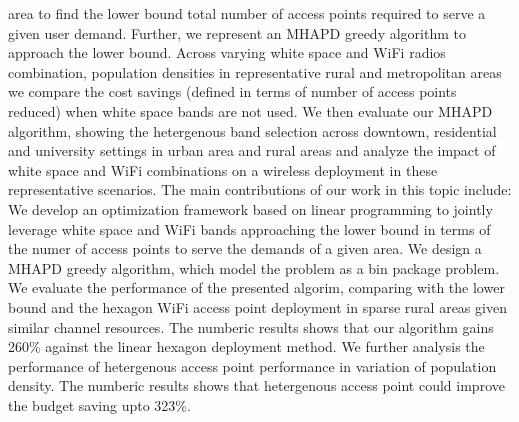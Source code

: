 area to find the lower bound total number of access points required to 
serve a given user demand. Further, we represent an MHAPD greedy algorithm 
to approach the lower bound. Across varying white space and WiFi radios 
combination, population densities in representative rural and metropolitan 
areas we compare the cost savings (defined in terms of number of access 
points reduced) when white space bands are not used. We then evaluate our 
MHAPD algorithm, showing the hetergenous band selection across downtown, 
residential and university settings in urban area and rural areas and analyze 
the impact of white space and WiFi combinations on a wireless deployment in 
these representative scenarios.
The main contributions of our work in this topic include: We develop an 
optimization framework based on linear programming to jointly leverage 
white space and WiFi bands approaching the lower bound in terms of the numer 
of access points to serve the demands of a given area. We design a MHAPD 
greedy algorithm, which model the problem as a bin package problem. We 
evaluate the performance of the presented algorim, comparing with the 
lower bound and the hexagon WiFi access point deployment in sparse rural 
areas given similar channel resources. The numberic results shows that our 
algorithm gains 260\% against the linear hexagon deployment method.  We 
further analysis the performance of hetergenous access point performance in 
variation of population density. The numberic results shows that hetergenous 
access point could improve the budget saving upto 323\%. 

